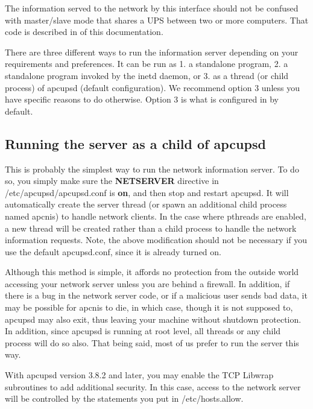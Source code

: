 {{{{{{{{{{The information served to the network by this interface should not be confused
with master/slave mode that shares a UPS between two or more computers. That
code is described in 
 of this
documentation.  

There are three different ways to run the information server depending on your
requirements and preferences. It can be run as 1.  a standalone program, 2. a
standalone program invoked by the inetd daemon, or 3. as a thread (or child
process) of apcupsd (default configuration). We recommend option 3 unless you
have specific reasons to do otherwise. Option 3 is what is configured in by
default. 

\label{Running-the-server-as-a-child-of-apcupsd}

\subsection*{Running the server as a child of apcupsd}

This is probably the simplest way to run the network information server. To do
so, you simply make sure the {\bf NETSERVER} directive in
/etc/apcupsd/apcupsd.conf is {\bf on}, and then stop and restart apcupsd. It
will automatically create the server thread (or spawn an additional child
process named apcnis) to handle network clients. In the case where pthreads
are enabled, a new thread will be created rather than a child process to
handle the network information requests. Note, the above modification should
not be necessary if you use the default apcupsd.conf, since it is already
turned on.  

Although this method is simple, it affords no protection from the outside
world accessing your network server unless you are behind a firewall. In
addition, if there is a bug in the network server code, or if a malicious user
sends bad data, it may be possible for apcnis to die, in which case, though it
is not supposed to, apcupsd may also exit, thus leaving your machine without
shutdown protection. In addition, since apcupsd is running at root level, all
threads or any child process will do so also. That being said, most of us
prefer to run the server this way.  

With apcupsd version 3.8.2 and later, you may enable the TCP Libwrap
subroutines to add additional security. In this case, access to the network
server will be controlled by the statements you put in /etc/hosts.allow. 

}}}}}}}}}}
